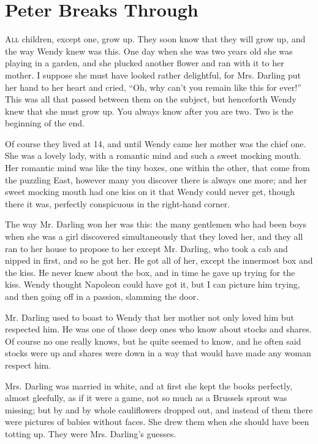 \chapter{Peter Breaks Through}

\lettrine{A}{ll} children, except one, grow up.
They soon know that they will grow up, and the way Wendy knew was this.
One day when she was two years old she was playing in a garden, and she plucked
another flower and ran with it to her mother.
I suppose she must have looked rather delightful, for Mrs. Darling put her hand
to her heart and cried, ``Oh, why can't you remain like this for ever!''
This was all that passed between them on the subject, but henceforth Wendy knew
that she must grow up.
You always know after you are two.
Two is the beginning of the end.

Of course they lived at 14, and until Wendy came her mother was the chief one.
She was a lovely lady, with a romantic mind and such a sweet mocking mouth.
Her romantic mind was like the tiny boxes, one within the other, that come from
the puzzling East, however many you discover there is always one more; and her
sweet mocking mouth had one kiss on it that Wendy could never get, though there
it was, perfectly conspicuous in the right-hand corner.

The way Mr. Darling won her was this: the many gentlemen who had been boys when
she was a girl discovered simultaneously that they loved her, and they all ran
to her house to propose to her except Mr. Darling, who took a cab and nipped in
first, and so he got her.
He got all of her, except the innermost box and the kiss. He never knew about
the box, and in time he gave up trying for the kiss.
Wendy thought Napoleon could have got it, but I can picture him trying, and then
going off in a passion, slamming the door.

Mr. Darling used to boast to Wendy that her mother not only loved him but
respected him.
He was one of those deep ones who know about stocks and shares.
Of course no one really knows, but he quite seemed to know, and he often said
stocks were up and shares were down in a way that would have made any woman
respect him.

Mrs. Darling was married in white, and at first she kept the books perfectly,
almost gleefully, as if it were a game, not so much as a Brussels sprout was
missing; but by and by whole cauliflowers dropped out, and instead of them
there were pictures of babies without faces.
She drew them when she should have been totting up.
They were Mrs. Darling's guesses.

